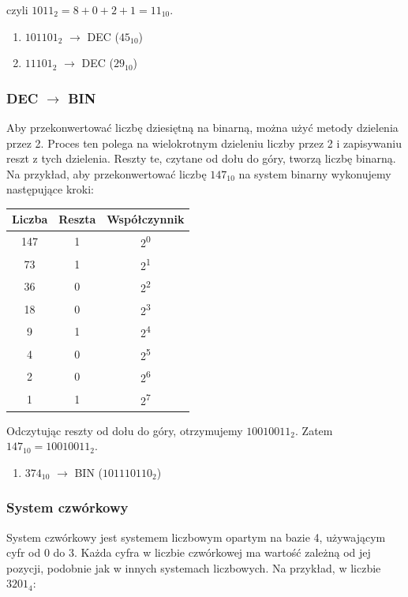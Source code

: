 \documentclass[a4paper,12pt]{article}
\begin{document}
czyli $1011_2 = 8 + 0 + 2 + 1 = 11_{10}$.

\begin{enumerate}
    \item $101101_2$ $\rightarrow$ DEC ($45_{10}$)
    \item $11101_2$ $\rightarrow$ DEC ($29_{10}$)
\end{enumerate}

\subsubsection*{DEC $\rightarrow$ BIN}
Aby przekonwertować liczbę dziesiętną na binarną, można użyć metody dzielenia przez 2. Proces ten polega na wielokrotnym dzieleniu liczby przez 2 i zapisywaniu reszt z tych dzielenia. Reszty te, czytane od dołu do góry, tworzą liczbę binarną. Na przykład, aby przekonwertować liczbę $147_{10}$ na system binarny wykonujemy następujące kroki:

\begin{table}[H]
\centering
\begin{tabular}{|c|c|c|}
\hline
Liczba & Reszta & Współczynnik \\
\hline
147 & 1 & 2\textsuperscript{0} \\
73 & 1 & 2\textsuperscript{1} \\
36 & 0 & 2\textsuperscript{2} \\
18 & 0 & 2\textsuperscript{3} \\
9 & 1 & 2\textsuperscript{4} \\
4 & 0 & 2\textsuperscript{5} \\
2 & 0 & 2\textsuperscript{6} \\
1 & 1 & 2\textsuperscript{7} \\
\hline
\end{tabular}
\end{table}
Odczytując reszty od dołu do góry, otrzymujemy $10010011_2$. Zatem $147_{10} = 10010011_2$.

\begin{enumerate}
    \item $374_{10}$ $\rightarrow$ BIN ($101110110_2$)
\end{enumerate}

\subsubsection*{System czwórkowy}
System czwórkowy jest systemem liczbowym opartym na bazie 4, używającym cyfr od 0 do 3. Każda cyfra w liczbie czwórkowej ma wartość zależną od jej pozycji, podobnie jak w innych systemach liczbowych. Na przykład, w liczbie $3201_4$:
\end{document}
